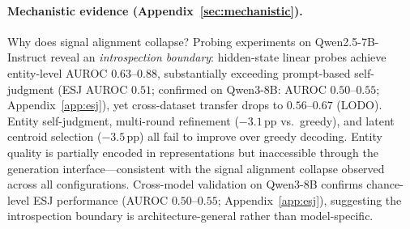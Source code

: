 \paragraph{Mechanistic evidence (Appendix~\ref{sec:mechanistic}).}
Why does signal alignment collapse? Probing experiments on Qwen2.5-7B-Instruct reveal an \textit{introspection boundary}: hidden-state linear probes achieve entity-level AUROC $0.63$--$0.88$, substantially exceeding prompt-based self-judgment (ESJ AUROC $0.51$; confirmed on Qwen3-8B: AUROC $0.50$--$0.55$; Appendix~\ref{app:esj}), yet cross-dataset transfer drops to $0.56$--$0.67$ (LODO).
Entity self-judgment, multi-round refinement ($-3.1$\,pp vs.\ greedy), and latent centroid selection ($-3.5$\,pp) all fail to improve over greedy decoding.
Entity quality is partially encoded in representations but inaccessible through the generation interface---consistent with the signal alignment collapse observed across all configurations.
Cross-model validation on Qwen3-8B confirms chance-level ESJ performance (AUROC $0.50$--$0.55$; Appendix~\ref{app:esj}), suggesting the introspection boundary is architecture-general rather than model-specific.
